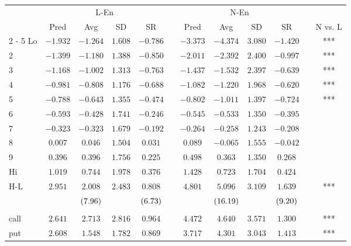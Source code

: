 \begin{tabular}{@{}lccccccccccc@{}}%
\toprule%
&\multicolumn{4}{c}{L{-}En}&&\multicolumn{4}{c}{N{-}En}&&\\%
\multicolumn{1}{c}{}&\multicolumn{1}{c}{Pred}&\multicolumn{1}{c}{Avg}&\multicolumn{1}{c}{SD}&\multicolumn{1}{c}{SR}&\multicolumn{1}{c}{}&\multicolumn{1}{c}{Pred}&\multicolumn{1}{c}{Avg}&\multicolumn{1}{c}{SD}&\multicolumn{1}{c}{SR}&\multicolumn{1}{c}{}&\multicolumn{1}{c}{N vs. L}\\%
\cmidrule{2%
-%
5}%
\cmidrule{7%
-%
10}%
\cmidrule{12%
-%
12}%
Lo&$-1.932$&$-1.264$&$1.608$&$-0.786$&&$-3.373$&$-4.374$&$3.080$&$-1.420$&&***\\%
2&$-1.399$&$-1.180$&$1.388$&$-0.850$&&$-2.011$&$-2.392$&$2.400$&$-0.997$&&***\\%
3&$-1.168$&$-1.002$&$1.313$&$-0.763$&&$-1.437$&$-1.532$&$2.397$&$-0.639$&&***\\%
4&$-0.981$&$-0.808$&$1.176$&$-0.688$&&$-1.082$&$-1.220$&$1.968$&$-0.620$&&***\\%
5&$-0.788$&$-0.643$&$1.355$&$-0.474$&&$-0.802$&$-1.011$&$1.397$&$-0.724$&&***\\%
6&$-0.593$&$-0.428$&$1.741$&$-0.246$&&$-0.545$&$-0.533$&$1.350$&$-0.395$&&\\%
7&$-0.323$&$-0.323$&$1.679$&$-0.192$&&$-0.264$&$-0.258$&$1.243$&$-0.208$&&\\%
8&$0.007$&$0.046$&$1.504$&$0.031$&&$0.089$&$-0.065$&$1.555$&$-0.042$&&\\%
9&$0.396$&$0.396$&$1.756$&$0.225$&&$0.498$&$0.363$&$1.350$&$0.268$&&\\%
Hi&$1.019$&$0.744$&$1.978$&$0.376$&&$1.428$&$0.723$&$1.704$&$0.424$&&\\%
\midrule%
H{-}L&$2.951$&$2.008$&$2.483$&$0.808$&&$4.801$&$5.096$&$3.109$&$1.639$&&***\\%
&&$\footnotesize{(7.96)}$&&$\footnotesize{(6.73)}$&&&$\footnotesize{(16.19)}$&&$\footnotesize{(9.20)}$&&\\%
&&&&&&&&&&&\\%
call&$2.641$&$2.713$&$2.816$&$0.964$&&$4.472$&$4.640$&$3.571$&$1.300$&&***\\%
put&$2.608$&$1.548$&$1.782$&$0.869$&&$3.717$&$4.301$&$3.043$&$1.413$&&***\\\bottomrule%
%
\end{tabular}